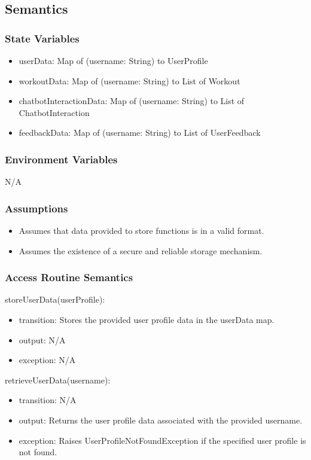 \documentclass[12pt, titlepage]{article}
\begin{document}
\subsection{Semantics}

\subsubsection{State Variables}
\begin{itemize}
\item userData: Map of (username: String) to UserProfile
\item workoutData: Map of (username: String) to List of Workout
\item chatbotInteractionData: Map of (username: String) to List of ChatbotInteraction
\item feedbackData: Map of (username: String) to List of UserFeedback

\end{itemize}

\subsubsection{Environment Variables}
N/A

\subsubsection{Assumptions}
\begin{itemize}
\item Assumes that data provided to store functions is in a valid format.
\item Assumes the existence of a secure and reliable storage mechanism.
\end{itemize}


\subsubsection{Access Routine Semantics}

\noindent storeUserData(userProfile):
\begin{itemize}
\item transition: Stores the provided user profile data in the userData map.
\item output: N/A
\item exception: N/A
\end{itemize}

\noindent retrieveUserData(username):
\begin{itemize}
\item transition: N/A
\item output: Returns the user profile data associated with the provided username.
\item exception: Raises UserProfileNotFoundException if the specified user profile is not found.
\end{itemize}
\end{document}
